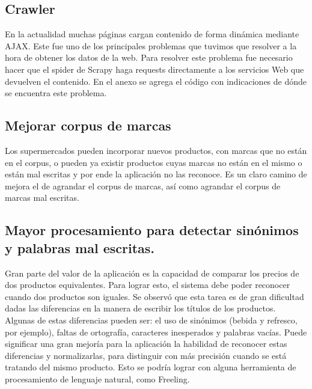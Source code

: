 \documentclass[12pt]{article} %
\begin{document}

\subsection{Crawler}

En la actualidad muchas páginas cargan contenido de forma dinámica mediante AJAX. Este fue uno de los principales problemas que tuvimos que resolver a la hora de obtener los datos de la web. Para resolver este problema fue necesario hacer que el spider de Scrapy haga requests directamente a los servicios Web que devuelven el contenido. En el anexo se agrega el código con indicaciones de dónde se encuentra este problema.


\subsection{Mejorar corpus de marcas}
Los supermercados pueden incorporar nuevos productos, con marcas que no están en el corpus, o pueden ya existir productos cuyas marcas no están en el mismo o están mal escritas y por ende la aplicación no las reconoce. Es un claro camino de mejora el de agrandar el corpus de marcas, así como agrandar el corpus de marcas mal escritas.


\subsection{Mayor procesamiento para detectar sinónimos y palabras mal escritas.}
Gran parte del valor de la aplicación es la capacidad de comparar los precios de dos productos equivalentes. Para lograr esto, el sistema debe poder reconocer cuando dos productos son iguales. Se observó que esta tarea es de gran dificultad dadas las diferencias en la manera de escribir los títulos de los productos. Algunas de estas diferencias pueden ser: el uso de sinónimos (bebida y refresco, por ejemplo), faltas de ortografía, caracteres inesperados y palabras vacías. Puede significar una gran mejoría para la aplicación la habilidad de reconocer estas diferencias y normalizarlas, para distinguir con más precisión cuando se está tratando del mismo producto. Esto se podría lograr con alguna herramienta de procesamiento de lenguaje natural, como Freeling.


\end{document}
